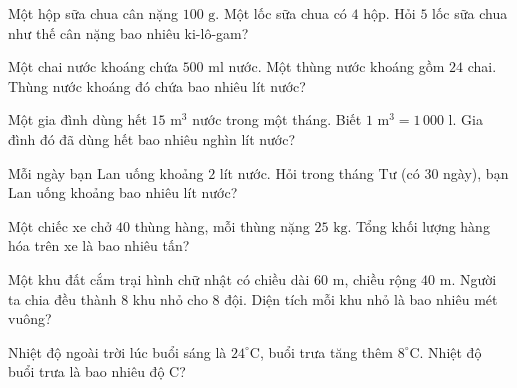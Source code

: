 \begin{ex}
  Một hộp sữa chua cân nặng $100\text{ g}$. Một lốc sữa chua có $4$ hộp. Hỏi $5$ lốc sữa chua như thế cân nặng bao nhiêu ki-lô-gam?
\end{ex}

\begin{ex}
  Một chai nước khoáng chứa $500\text{ ml}$ nước. Một thùng nước khoáng gồm $24$ chai. Thùng nước khoáng đó chứa bao nhiêu lít nước?
\end{ex}

\begin{ex}
  Một gia đình dùng hết $15\text{ m}^3$ nước trong một tháng. Biết $1\text{ m}^3 = 1\,000\text{ l}$. Gia đình đó đã dùng hết bao nhiêu nghìn lít nước?
\end{ex}

\begin{ex}
  Mỗi ngày bạn Lan uống khoảng $2$ lít nước. Hỏi trong tháng Tư (có $30$ ngày), bạn Lan uống khoảng bao nhiêu lít nước?
\end{ex}

\begin{ex}
  Một chiếc xe chở $40$ thùng hàng, mỗi thùng nặng $25\text{ kg}$. Tổng khối lượng hàng hóa trên xe là bao nhiêu tấn?
\end{ex}

\begin{ex}
  Một khu đất cắm trại hình chữ nhật có chiều dài $60\text{ m}$, chiều rộng $40\text{ m}$. Người ta chia đều thành $8$ khu nhỏ cho 8 đội. Diện tích mỗi khu nhỏ là bao nhiêu mét vuông?
\end{ex}

\begin{ex}
  Nhiệt độ ngoài trời lúc buổi sáng là $24^\circ\text{C}$, buổi trưa tăng thêm $8^\circ\text{C}$. Nhiệt độ buổi trưa là bao nhiêu độ C?
\end{ex}

